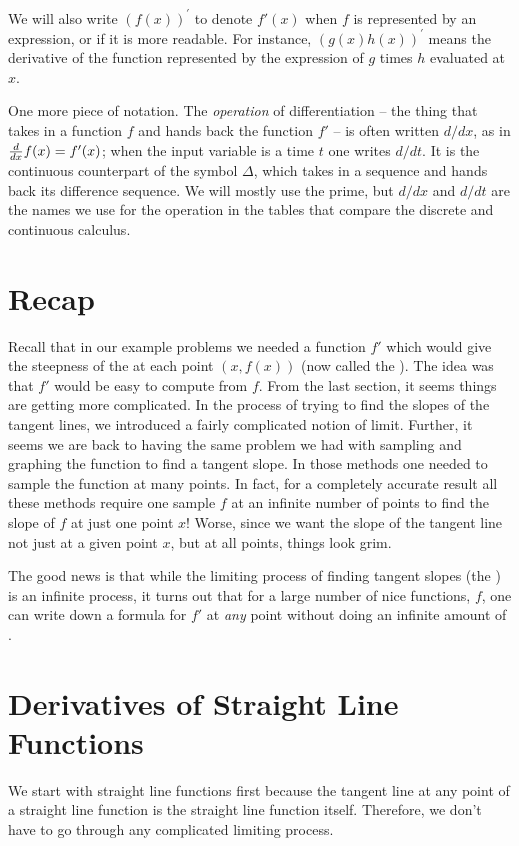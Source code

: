 We will also write $(f(x))^\prime$ to denote $f'(x)$ when $f$ is represented by an expression, or if it is more readable.
For instance, $(g(x) h(x))^\prime$ means the derivative of the function represented by the expression of $g$ times $h$
evaluated at $x$.

One more piece of notation. The {\it operation\/} of differentiation -- the thing that takes in a function $f$ and
hands back the function $f'$ -- is often written $d/dx$, as in ${d \over dx} f(x) = f'(x)$; when the input
variable is a time $t$ one writes $d/dt$. It is the continuous counterpart of the symbol $\Delta$, which takes
in a sequence and hands back its difference sequence. We will mostly use the prime, but $d/dx$ and $d/dt$ are the
names we use for the operation in the tables that compare the discrete and continuous calculus.

\section{Recap}

Recall that in our example problems we needed a function $f'$ which would
give the steepness of the  at each point
$(x,f(x))$ (now called the ).
The idea was that $f'$ would be easy to compute from $f$. From the last 
section, it seems things are getting more complicated. In the process of 
trying to find the slopes of the tangent lines, we introduced a fairly 
complicated notion of limit. Further, it seems we are back to having the 
same problem we had with sampling and graphing the function to find a 
tangent slope. In those methods one needed to sample the function at many 
points. In fact, for a completely accurate result all these methods require
one sample $f$ at an infinite number of points to find the slope of $f$ at 
just one point $x$! Worse, since we want 
the slope of the tangent line not just at a given point $x$, but at all points, 
things look grim. 

The good news is that while the limiting process of finding tangent 
slopes (the ) 
is an infinite process, it turns out that for a large number of nice 
functions, $f$, one can write down a formula for $f'$ at {\it any\/} point without doing 
an infinite amount of . 

\section{Derivatives of Straight Line Functions}
We start with straight line functions first because the tangent line at any point of a straight line function
is the straight line function itself.
Therefore, we don't have to go through any complicated limiting process.

